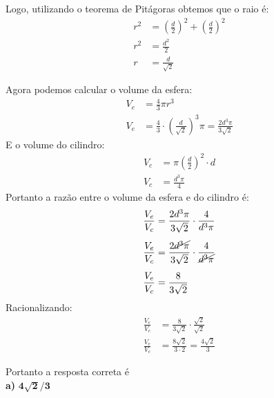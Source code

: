 \begin{multicols*}{2}
    Logo, utilizando o teorema de Pitágoras obtemos que o raio é:
    \begin{align}
        r^2 &= \left(\frac{d}{2}\right)^2+\left(\frac{d}{2}\right)^2\\[1ex]
        r^2 &= \frac{d^2}{2}\\[1ex]
        r &= \frac{d}{\sqrt{2}}
    \end{align} 

    Agora podemos calcular o volume da esfera:
    \begin{align}
        V_e &= \frac{4}{3}\pi r^3 \\[1ex]
        V_e &= \frac{4}{3}\cdot\left(\frac{d}{\sqrt{2}}\right)^3\pi
        = \frac{2d^3\pi}{3\sqrt{2}}
    \end{align}
    E o volume do cilindro:
    \begin{align}
        V_c &= \pi \left( \frac{d}{2} \right)^2 \cdot d\\[1ex]
        V_c &= \frac{d^3\pi}{4}
    \end{align}
    Portanto a razão entre o volume da esfera e do cilindro é:
    \begin{align}
        \frac{V_e}{V_c} &= \frac{2d^3\pi}{3\sqrt{2}}\cdot \frac{4}{d^3\pi}\\[1ex]
        \frac{V_e}{V_c} &= \frac{2\cancel{d^3\pi}}{3\sqrt{2}}\cdot \frac{4}{\cancel{d^3\pi}}\\[1ex]
        \frac{V_e}{V_c} &= \frac{8}{3\sqrt{2}}
    \end{align}
    Racionalizando:
    \begin{align}
        \frac{V_e}{V_c} &= \frac{8}{3\sqrt{2}} \cdot\frac{\sqrt{2}}{\sqrt{2}}\\
        \frac{V_e}{V_c} &= \frac{8\sqrt{2}}{3\cdot2} = \frac{4\sqrt{2}}{3}
    \end{align}

    \noindent Portanto a resposta correta é \\\textbf{a)} $\mathbf{4\sqrt{2}/3}$
    


\end{multicols*}
